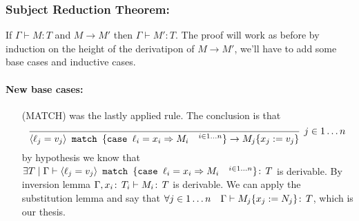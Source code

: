 \subsubsection*{Subject Reduction Theorem:}

If \(\Gamma \vdash M: T\) and \(M \to M'\) then \(\Gamma \vdash M':
T\). The proof will work as before by induction on the height of the
derivatipon of \(M \to M'\), we'll have to add some base cases and
inductive cases.
\paragraph*{New base cases:\\}
\begin{itemize}
\item[(MATCH)] was the lastly applied rule. The conclusion is
  that \[\infer[j\in 1\dots n]{\MATCH{\VAR{\ell_j = v_j} }{
      \CASE{\ell_i}{x_i}{M_i} \quad^{i\in 1\dots n}} \to
    M_j\SUBST{x_j}{v_j}}{}\] by hypothesis we know that \(\exists T
  \mid \Gamma \vdash \langle \ell_j = v_j \rangle\texttt{ match }\{
    \texttt{case }\ell_i = x_i \Rightarrow M_i \quad^{i\in 1\dots n}\} \!:\,T\) is
  derivable. By inversion lemma \(\Gamma, x_i \!:\,T_i \vdash M_i
  \!:\,T\) is derivable. We can apply the substitution lemma and say
  that \(\forall j \in 1 \dots n \quad \Gamma \vdash M_j
  \{x_j:=N_j\} \!:\,T\), which is our thesis.
\end{itemize}

